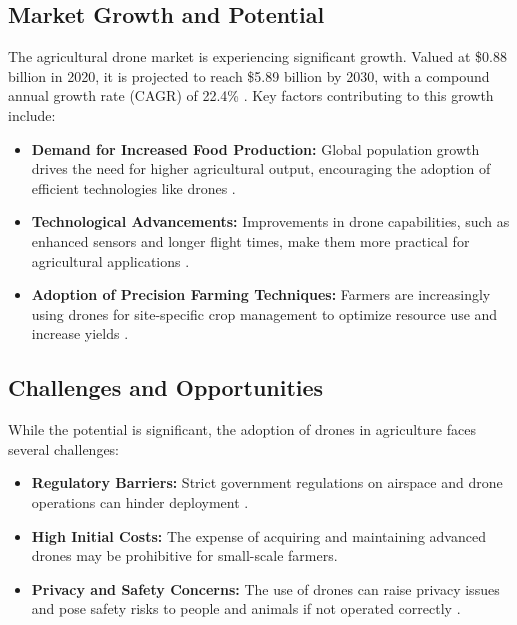\subsection{Market Growth and Potential}

The agricultural drone market is experiencing significant growth. Valued at \$0.88 billion in 2020, it is projected to reach \$5.89 billion by 2030, with a compound annual growth rate (CAGR) of 22.4\% \citep{alliedmarketresearch2021}. Key factors contributing to this growth include:

\begin{itemize} 
	\item \textbf{Demand for Increased Food Production:} Global population growth drives the need for higher agricultural output, encouraging the adoption of efficient technologies like drones \citep{nazarov2023}. 
	\item \textbf{Technological Advancements:} Improvements in drone capabilities, such as enhanced sensors and longer flight times, make them more practical for agricultural applications \citep{guardianagriculture}. 
	\item \textbf{Adoption of Precision Farming Techniques:} Farmers are increasingly using drones for site-specific crop management to optimize resource use and increase yields \citep{alliedmarketresearch2021}. 
\end{itemize}

\subsection{Challenges and Opportunities}

While the potential is significant, the adoption of drones in agriculture faces several challenges:

\begin{itemize} 
	\item \textbf{Regulatory Barriers:} Strict government regulations on airspace and drone operations can hinder deployment \citep{nazarov2023}. 
	\item \textbf{High Initial Costs:} The expense of acquiring and maintaining advanced drones may be prohibitive for small-scale farmers.
	\item \textbf{Privacy and Safety Concerns:} The use of drones can raise privacy issues and pose safety risks to people and animals if not operated correctly \citep{petiole_drones_risks}. 
\end{itemize}

